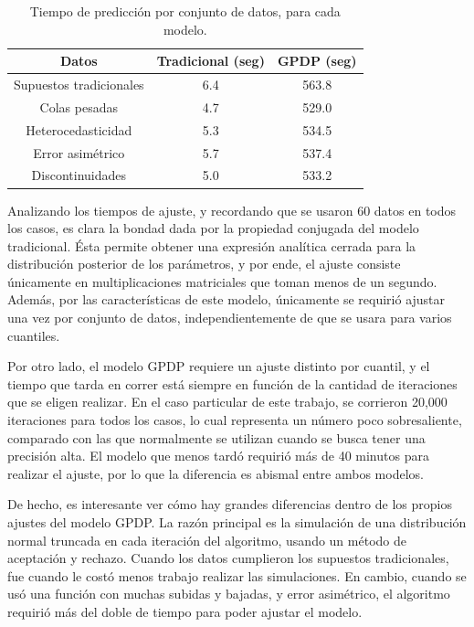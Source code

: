 \begin{table}[H]
\centering
\caption{Tiempo de predicción por conjunto de datos, para cada modelo.} 
\begin{tabular}{ccc}
  \hline
Datos & Tradicional (seg) & GPDP (seg) \\ 
  \hline
Supuestos tradicionales & 6.4 & 563.8 \\ 
  Colas pesadas & 4.7 & 529.0 \\ 
  Heterocedasticidad & 5.3 & 534.5 \\ 
  Error asimétrico & 5.7 & 537.4 \\ 
  Discontinuidades & 5.0 & 533.2 \\ 
   \hline
\end{tabular}
\label{pred_time}
\end{table}

Analizando los tiempos de ajuste, y recordando que se usaron 60 datos en todos los casos, es clara la bondad dada por la propiedad conjugada del modelo tradicional. \'Esta permite obtener una expresi\'on anal\'itica cerrada para la distribuci\'on posterior de los par\'ametros, y por ende, el ajuste consiste \'unicamente en multiplicaciones matriciales que toman menos de un segundo. Adem\'as, por las caracter\'isticas de este modelo, \'unicamente se requiri\'o ajustar una vez por conjunto de datos, independientemente de que se usara para varios cuantiles.

Por otro lado, el modelo GPDP requiere un ajuste distinto por cuantil, y el tiempo que tarda en correr est\'a siempre en funci\'on de la cantidad de iteraciones que se eligen realizar. En el caso particular de este trabajo, se corrieron 20,000 iteraciones para todos los casos, lo cual representa un n\'umero poco sobresaliente, comparado con las que normalmente se utilizan cuando se busca tener una precisi\'on alta. El modelo que menos tard\'o requiri\'o m\'as de 40 minutos para realizar el ajuste, por lo que la diferencia es abismal entre ambos modelos.

De hecho, es interesante ver c\'omo hay grandes diferencias dentro de los propios ajustes del modelo GPDP. La raz\'on principal es la simulaci\'on de una distribuci\'on normal truncada en cada iteraci\'on del algoritmo, usando un m\'etodo de aceptaci\'on y rechazo. Cuando los datos cumplieron los supuestos tradicionales, fue cuando le cost\'o menos trabajo realizar las simulaciones. En cambio, cuando se us\'o una funci\'on con muchas subidas y bajadas, y error asim\'etrico, el algoritmo requiri\'o m\'as del doble de tiempo para poder ajustar el modelo.

